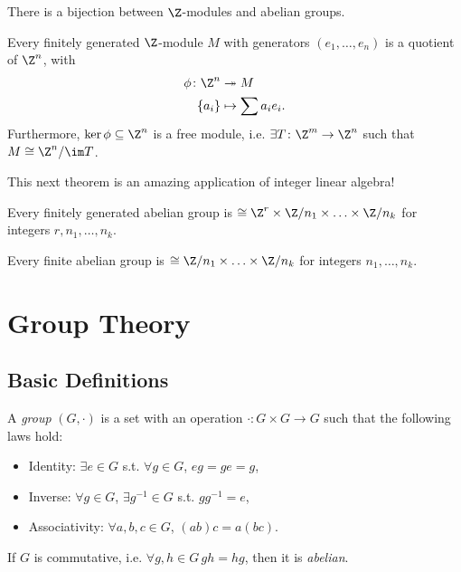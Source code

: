 \documentclass{notes}
\begin{document}
\begin{theorem}
    There is a bijection between $\Z$-modules and abelian groups.
\end{theorem}

\begin{lemma}
    Every finitely generated $\Z $-module $M$ with generators $\left( {e}_{1},\ldots,{e}_{n}  \right) $ is a quotient of $\Z ^{n}$, with
    \begin{align*}
        \phi \colon \Z ^{n} &\twoheadrightarrow M \\
        \{{a}_i\} &\mapsto \sum a_ie_i
    .\end{align*}
    Furthermore, $\ker \phi \subseteq \Z^{n}$ is a free module, i.e. $\exists T\colon \Z ^{m} \to \Z ^{n} $ such that $M\cong \Z ^{n}/\im T$.
\end{lemma}

This next theorem is an amazing application of integer linear algebra!

\begin{theorem}
    Every finitely generated abelian group is $\cong \Z ^{r}\times \Z /n_1\times \ldots \times \Z /n_k$ for integers $r,{n}_{1},\ldots,{n}_{k} $.
\end{theorem}

\begin{corollary}
    Every finite abelian group is $\cong \Z /n_1\times \ldots \times \Z /n_k$ for integers ${n}_{1},\ldots,{n}_{k} $.
\end{corollary}

\section{Group Theory}

\subsection{Basic Definitions}

\begin{defn}
    A \emph{group} $(G,\cdot )$ is a set with an operation $\cdot \colon G\times G \to G $ such that the following laws hold:
    \begin{itemize}
        \item Identity: $\exists e\in G$ s.t. $\forall g\in G$, $eg=ge=g$,
        \item Inverse: $\forall g\in G$, $\exists g^{-1}\in G$ s.t. $gg^{-1}=e$,
        \item Associativity: $\forall a,b,c\in G$, $(ab)c=a(bc)$.    
    \end{itemize}
    
    If $G$ is commutative, i.e. $\forall g,h\in G\,gh=hg$, then it is \emph{abelian}.
\end{defn}
\end{document}
